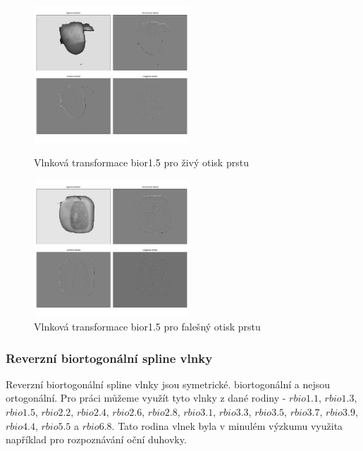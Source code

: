\begin{figure}[!htbp]
  \begin{minipage}[b]{0.5\linewidth}
    \centering
    \includegraphics[width=220px]{obrazky-figures/Images14bior15mean.png}
    \caption{Vlnková transformace bior1.5 pro živý otisk prstu}
  \end{minipage}
  \hspace{0.5cm}
  \begin{minipage}[b]{0.5\linewidth}
    \centering
    \includegraphics[width=220px]{obrazky-figures/fake21otsubior15.png}
    \caption{Vlnková transformace bior1.5 pro falešný otisk prstu}
  \end{minipage}
\end{figure}



\subsubsection{Reverzní biortogonální spline vlnky}
Reverzní biortogonální spline vlnky jsou symetrické. biortogonální a nejsou ortogonální. Pro práci můžeme využít tyto vlnky z dané rodiny - $rbio1.1$, $rbio1.3$, $rbio1.5$, $rbio2.2$, $rbio2.4$, $rbio2.6$, $rbio2.8$, $rbio3.1$, $rbio3.3$, $rbio3.5$, $rbio3.7$, $rbio3.9$, $rbio4.4$, $rbio 5.5$ a $rbio6.8$. \cite{PyWaveletsBrowser} Tato rodina vlnek byla v minulém výzkumu využita například pro rozpoznávání oční duhovky. \cite{IrisRecognition}\\\\

